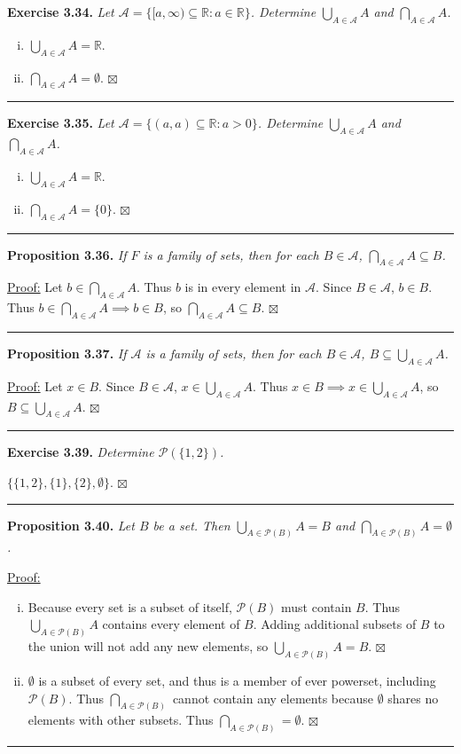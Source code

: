 \documentclass[a4paper,12pt]{article}
\newcommand{\entry}[3]
{
   \noindent\textbf{#1.}
   \emph{#2}
   \bigskip

   \noindent#3
   \bigskip
   \hrule
   \vspace{24pt}
}
\newcommand{\biguni}[1]
{
\displaystyle\bigcup_{#1}
}
\newcommand{\bigint}[1]
{
\displaystyle\bigcap_{#1}
}
\newcommand{\powerset}{\mathscr{P}}
\newcommand{\reals}{\mathbb{R}}
\newcommand{\scripta}{\mathscr{A}}
\newcommand{\sig}{$\boxtimes$}
\begin{document}
\entry{Exercise 3.34}
{Let $\scripta = \{ [a, \infty) \subseteq \reals : a \in \reals \}$. Determine $\biguni{A \in \scripta} A$ and $\bigint{A \in \scripta} A$.}
{
\begin{enumerate}[(i)]
\item
$\biguni{A \in \scripta} A = \reals$.
\item
$\bigint{A \in \scripta} A = \emptyset$. \sig
\end{enumerate}
}



\entry{Exercise 3.35}
{Let $\scripta = \{ (a, a) \subseteq \reals : a > 0 \}$. Determine $\biguni{A \in \scripta} A$ and $\bigint{A \in \scripta} A$.}
{
\begin{enumerate}[(i)]
\item
$\biguni{A \in \scripta} A = \reals$.
\item
$\bigint{A \in \scripta} A = \{ 0 \}$. \sig
\end{enumerate}
}



\entry{Proposition 3.36}
{If $F$ is a family of sets, then for each $B \in \scripta$, $\bigint{A \in \scripta} A \subseteq B$.}
{\underline{Proof:} Let $b \in \bigint{A \in \scripta} A$. Thus $b$ is in every element in $\scripta$. Since $B \in \scripta$, $b \in B$. Thus $b \in \bigint{A \in \scripta} A \implies b \in B$, so $\bigint{A \in \scripta} A \subseteq B$. \sig}



\entry{Proposition 3.37}
{If $\scripta$ is a family of sets, then for each $B \in \scripta$, $B \subseteq \biguni{A \in \scripta} A$.}
{\underline{Proof:} Let $x \in B$. Since $B \in \scripta$, $x \in \biguni{A \in \scripta} A$. Thus $x \in B \implies x \in \biguni{A \in \scripta} A$, so $B \subseteq \biguni{A \in \scripta} A$. \sig}



\entry{Exercise 3.39}
{Determine $\powerset( \{ 1, 2 \})$.}
{$\{ \{ 1, 2 \}, \{ 1 \}, \{ 2 \}, \emptyset \}$. \sig}



\entry{Proposition 3.40}
{Let $B$ be a set. Then $\biguni{A \in \powerset(B)} A = B$ and $\bigint{A \in \powerset(B)} A = \emptyset$.}
{
\underline{Proof:}
\begin{enumerate}[(i)]
\item
Because every set is a subset of itself, $\powerset(B)$ must contain $B$. Thus $\biguni{A \in \powerset(B)} A$ contains every element of $B$. Adding additional subsets of $B$ to the union will not add any new elements, so $\biguni{A \in \powerset(B)} A = B$. \sig
\item
$\emptyset$ is a subset of every set, and thus is a member of ever powerset, including $\powerset(B)$. Thus $\bigint{A \in \powerset(B)}$ cannot contain any elements because $\emptyset$ shares no elements with other subsets. Thus $\bigint{A \in \powerset(B)} = \emptyset$. \sig
\end{enumerate}
}
\end{document}
